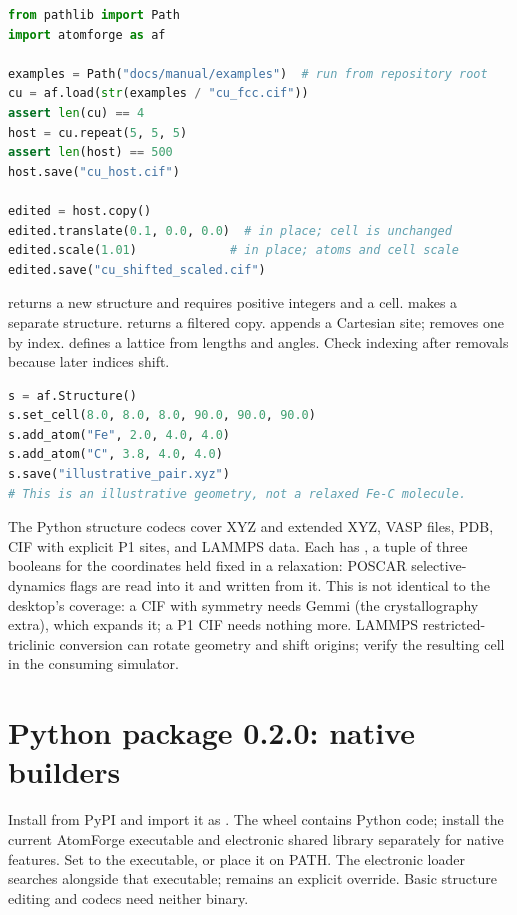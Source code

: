 \begin{lstlisting}[language=Python]
from pathlib import Path
import atomforge as af

examples = Path("docs/manual/examples")  # run from repository root
cu = af.load(str(examples / "cu_fcc.cif"))
assert len(cu) == 4
host = cu.repeat(5, 5, 5)
assert len(host) == 500
host.save("cu_host.cif")

edited = host.copy()
edited.translate(0.1, 0.0, 0.0)  # in place; cell is unchanged
edited.scale(1.01)             # in place; atoms and cell scale
edited.save("cu_shifted_scaled.cif")
\end{lstlisting}
 returns a new structure and requires positive integers and a cell.  makes a separate structure.  returns a filtered copy.  appends a Cartesian site;  removes one by index.  defines a lattice from lengths and angles. Check indexing after removals because later indices shift.

\begin{lstlisting}[language=Python]
s = af.Structure()
s.set_cell(8.0, 8.0, 8.0, 90.0, 90.0, 90.0)
s.add_atom("Fe", 2.0, 4.0, 4.0)
s.add_atom("C", 3.8, 4.0, 4.0)
s.save("illustrative_pair.xyz")
# This is an illustrative geometry, not a relaxed Fe-C molecule.
\end{lstlisting}

The Python structure codecs cover XYZ and extended XYZ, VASP files, PDB, CIF with explicit P1 sites, and LAMMPS data. Each  has , a tuple of three booleans for the coordinates held fixed in a relaxation: POSCAR selective-dynamics flags are read into it and written from it. This is not identical to the desktop's coverage: a CIF with symmetry needs Gemmi (the crystallography extra), which expands it; a P1 CIF needs nothing more. LAMMPS restricted-triclinic conversion can rotate geometry and shift origins; verify the resulting cell in the consuming simulator.

\section{Python package 0.2.0: native builders}
Install  from PyPI and import it as . The wheel contains Python code; install the current AtomForge executable and electronic shared library separately for native features. Set  to the executable, or place it on PATH. The electronic loader searches alongside that executable;  remains an explicit override. Basic structure editing and codecs need neither binary.

